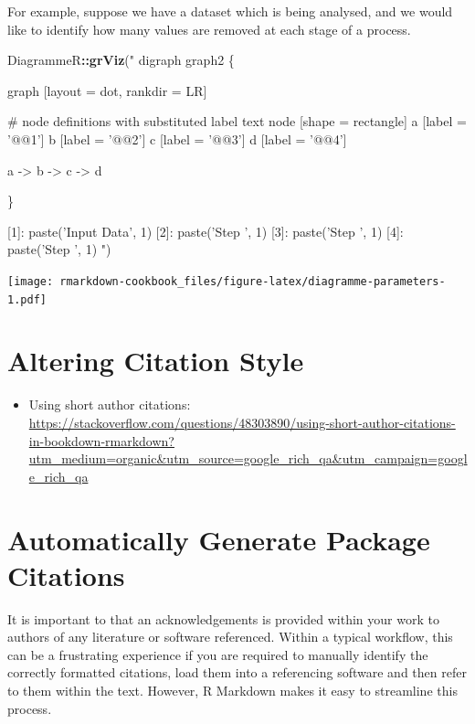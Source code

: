 \documentclass[]{book}
\newenvironment{Shaded}{\begin{snugshade}}{\end{snugshade}}
\newcommand{\KeywordTok}[1]{\textcolor[rgb]{0.13,0.29,0.53}{\textbf{#1}}}
\newcommand{\NormalTok}[1]{#1}
\newcommand{\OperatorTok}[1]{\textcolor[rgb]{0.81,0.36,0.00}{\textbf{#1}}}
\newcommand{\StringTok}[1]{\textcolor[rgb]{0.31,0.60,0.02}{#1}}
\providecommand{\tightlist}{%
  \setlength{\itemsep}{0pt}\setlength{\parskip}{0pt}}
\theoremstyle{definition}
\theoremstyle{definition}
\theoremstyle{definition}
\theoremstyle{remark}
\begin{document}
For example, suppose we have a dataset which is being analysed, and we
would like to identify how many values are removed at each stage of a
process.

\begin{Shaded}
\begin{Highlighting}[]
\NormalTok{DiagrammeR}\OperatorTok{::}\KeywordTok{grViz}\NormalTok{(}\StringTok{"}
\StringTok{digraph graph2 \{}

\StringTok{graph [layout = dot, rankdir = LR]}

\StringTok{# node definitions with substituted label text}
\StringTok{node [shape = rectangle]}
\StringTok{a [label = '@@1']}
\StringTok{b [label = '@@2']}
\StringTok{c [label = '@@3']}
\StringTok{d [label = '@@4']}

\StringTok{a -> b -> c -> d}

\StringTok{\}}

\StringTok{[1]: paste('Input Data', 1)}
\StringTok{[2]: paste('Step ', 1)}
\StringTok{[3]: paste('Step ', 1)}
\StringTok{[4]: paste('Step ', 1)}
\StringTok{"}\NormalTok{)}
\end{Highlighting}
\end{Shaded}

\texttt{[image: rmarkdown-cookbook\_files/figure-latex/diagramme-parameters-1.pdf]}

\hypertarget{altering-citation-style}{%
\section{Altering Citation Style}\label{altering-citation-style}}

\begin{itemize}
\tightlist
\item
  Using short author citations:
  \url{https://stackoverflow.com/questions/48303890/using-short-author-citations-in-bookdown-rmarkdown?utm_medium=organic\&utm_source=google_rich_qa\&utm_campaign=google_rich_qa}
\end{itemize}

\hypertarget{automatically-generate-package-citations}{%
\section{Automatically Generate Package
Citations}\label{automatically-generate-package-citations}}

It is important to that an acknowledgements is provided within your work
to authors of any literature or software referenced. Within a typical
workflow, this can be a frustrating experience if you are required to
manually identify the correctly formatted citations, load them into a
referencing software and then refer to them within the text. However, R
Markdown makes it easy to streamline this process.
\end{document}
